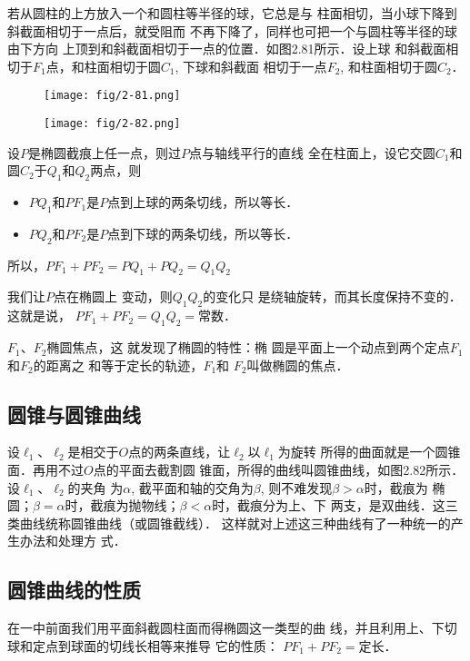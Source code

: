 若从圆柱的上方放入一个和圆柱等半径的球，它总是与
柱面相切，当小球下降到斜截面相切于一点后，就受阻而
不再下降了，同样也可把一个与圆柱等半径的球由下方向
上顶到和斜截面相切于一点的位置．如图2.81所示．设上球
和斜截面相切于$F_1$点，和柱面相切于圆$C_1$, 下球和斜截面
相切于一点$F_2$, 和柱面相切于圆$C_2$．

\begin{figure}[htp]\centering
    \begin{minipage}[t]{0.48\textwidth}
    \centering
\texttt{[image: fig/2-81.png]}
    \caption{}
    \end{minipage}
    \begin{minipage}[t]{0.48\textwidth}
    \centering
\texttt{[image: fig/2-82.png]}
    \caption{}
    \end{minipage}
    \end{figure}

设$P$是椭圆截痕上任一点，则过$P$点与轴线平行的直线
全在柱面上，设它交圆$C_1$和圆$C_2$于$Q_1$和$Q_2$两点，则
\begin{itemize}
    \item $PQ_1$和$PF_1$是$P$点到上球的两条切线，所以等长．
    \item   $PQ_2$和$PF_2$是$P$点到下球的两条切线，所以等长．
\end{itemize}

所以，$PF_1+PF_2=PQ_1+PQ_2=Q_1Q_2$

我们让$P$点在椭圆上
变动，则$Q_1Q_2$的变化只
是绕轴旋转，而其长度保持不变的．这就是说，
$PF_1+PF_2=Q_1Q_2=$常数．

$F_1$、$F_2$椭圆焦点，这
就发现了椭圆的特性：椭
圆是平面上一个动点到两个定点$F_1$和$F_2$的距离之
和等于定长的轨迹，$F_1$和
$F_2$叫做椭圆的焦点．

\subsection{圆锥与圆锥曲线}

设$\ell_1$、$\ell_2$是相交于$O$点的两条直线，让$\ell_2$以$\ell_1$为旋转
所得的曲面就是一个圆锥面．再用不过$O$点的平面去截割圆
锥面，所得的曲线叫圆锥曲线，如图2.82所示．设$\ell_1$、$\ell_2$的夹角
为$\alpha$, 截平面和轴的交角为$\beta$, 则不难发现$\beta>\alpha$时，截痕为
椭圆；$\beta=\alpha$时，截痕为抛物线；$\beta<\alpha$时，截痕分为上、下
两支，是双曲线．这三类曲线统称圆锥曲线（或圆锥截线）．
这样就对上述这三种曲线有了一种统一的产生办法和处理方
式．

\subsection{圆锥曲线的性质}
在一中前面我们用平面斜截圆柱面而得椭圆这一类型的曲
线，并且利用上、下切球和定点到球面的切线长相等来推导
它的性质：
$PF_1+PF_2=$定长．

